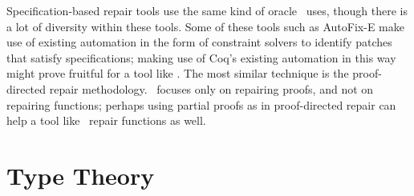 

Specification-based repair tools use
the same kind of oracle \sysname\ uses,
though there is a lot of diversity
within these tools. %
Some of these tools such as AutoFix-E make
use of existing automation in the form of constraint
solvers to identify patches that satisfy specifications;
making use of Coq's existing automation
in this way might prove fruitful for a tool like \sysname.
The most similar technique is the proof-directed repair methodology. 
\sysname\ focuses
only on repairing proofs, and not
on repairing functions; perhaps using partial 
proofs as in proof-directed repair
can help a tool like \sysname\
repair functions as well.

\section{Type Theory}


